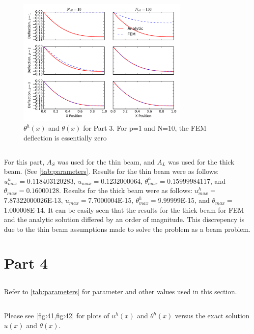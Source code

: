 \documentclass{article}
\begin{document}
\begin{figure}[ht]
	\centering
	\includegraphics[width=0.75\textwidth]{beam1_deflection_prob3_dof4}
	\caption{$\theta^h(x)$ and $\theta(x)$ for Part 3. For p=1 and N=10, the FEM deflection is essentially zero}
	\label{fig:32}
\end{figure}

\subsection{}
For this part, $A_S$ was used for the thin beam, and $A_L$ was used for the thick beam. (See \cref{tab:parameters}. Results for the thin beam were as follows: $u^h_{max} = 0.118403120283$, $u_{max} = 0.1232000064$, $\theta^h_{max} =  0.15999984117 $, and $\theta_{max} = 0.16000128$. Results for the thick beam were as follows: $u^h_{max} = $7.87322000026E-13, $u_{max} = $7.7000004E-15, $\theta^h_{max} = $9.99999E-15, and $\theta_{max} = $1.000008E-14. It can be easily seen that the results for the thick beam for FEM and the analytic solution differed by an order of magnitude. This discrepency is due to the thin beam assumptions made to solve the problem as a beam problem.

\section{Part 4}

\subsection{}
Refer to \cref{tab:parameters} for parameter and other values used in this section.

\subsection{}
Please see \cref{fig:41,fig:42} for plots of $u^h(x)$ and $\theta^h(x)$ versus the exact solution $u(x)$ and $\theta(x)$.
\end{document}

